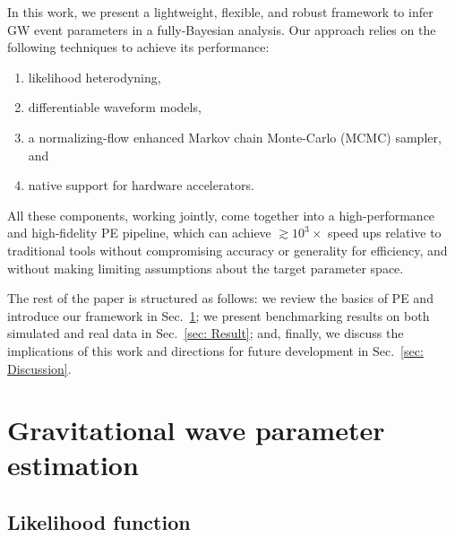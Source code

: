 \documentclass[twocolumn]{aastex631}
\begin{document}
In this work, we present a lightweight, flexible, and robust
framework to infer GW event parameters in a fully-Bayesian analysis. Our
approach relies on the following techniques to achieve its performance:
\begin{enumerate}
\setlength{\itemsep}{0pt}
\item likelihood heterodyning,
\item differentiable waveform models,
\item a normalizing-flow enhanced Markov chain Monte-Carlo (MCMC) sampler, and
\item native support for hardware accelerators.
\end{enumerate}
All these components, working jointly, come together into a high-performance
and high-fidelity PE pipeline, which can achieve ${\gtrsim}10^3\times$ speed
ups relative to traditional tools without compromising accuracy or generality
for efficiency, and without making limiting assumptions about the target
parameter space.

The rest of the paper is structured as follows: we review the basics of PE and
introduce our framework in Sec.~\ref{sec: PE}; we present benchmarking results
on both simulated and real data in Sec.~\ref{sec: Result}; and, finally, we
discuss the implications of this work and directions for future development in
Sec.~\ref{sec: Discussion}.

\section{Gravitational wave parameter estimation}
\label{sec: PE}

\subsection{Likelihood function}
\label{sec:likelihood}
\end{document}
